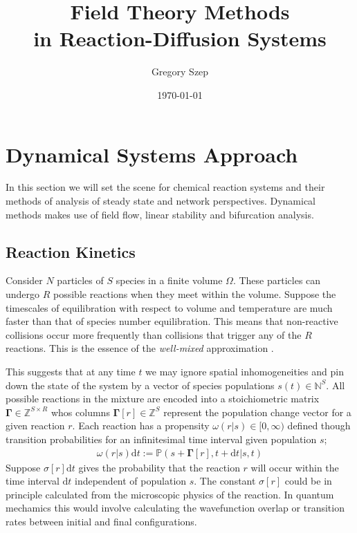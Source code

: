 \documentclass{article}[12pt]
\numberwithin{equation}{section}
\begin{document}
\title{
Field Theory Methods \\
in Reaction-Diffusion Systems
}

\author{Gregory Szep}
\date{\today}
\maketitle
\vspace{-25pt}
\section{Dynamical Systems Approach} \vspace{-10pt}
In this section we will set the scene for chemical reaction systems and their
methods of analysis of steady state and network perspectives. Dynamical
methods makes use of field flow, linear stability and bifurcation analysis.
\subsection{Reaction Kinetics} \vspace{-10pt}
Consider $N$ particles of $S$ species in a finite volume $\Omega$. These particles
can undergo $R$ possible reactions when they meet within the volume. Suppose the
timescales of equilibration with respect to volume and temperature are much faster
than that of species number equilibration. This means that non-reactive collisions
occur more frequently than collisions that trigger any of the $R$ reactions. This
is the essence of the \textit{well-mixed} approximation \cite{Gillespie1992}.

This suggests that at any time $t$ we may ignore spatial inhomogeneities and pin
down the state of the system by a vector of species populations $s(t)\in\mathbb{N}^S$.
All possible reactions in the mixture are encoded into a stoichiometric matrix
$\mathbf{\Gamma}\in\mathbb{Z}^{S\times R}$ whos columns $\mathbf{\Gamma}[r]\in\mathbb{Z}^{S}$
represent the population change vector for a given reaction $r$. Each reaction
has a propensity $\omega(r|s)\in[0,\infty)$ defined though transition
probabilities for an infinitesimal time interval given population $s$;
\begin{align}
	\omega(r|s)\mathrm{d}t := \mathbb{P}(s+\mathbf{\Gamma}[r],t+\mathrm{d}t|s,t)
	\label{eq:fundamentalpremise}
\end{align}
Suppose $\sigma[r]\mathrm{d}t$ gives the probability that the reaction $r$
will occur within the time interval $\mathrm{d}t$ independent of population
$s$. The constant $\sigma[r]$ could be in principle calculated from the
microscopic physics of the reaction. In quantum mechamics this would involve
calculating the wavefunction overlap or transition rates between initial and
final configurations.
\end{document}

